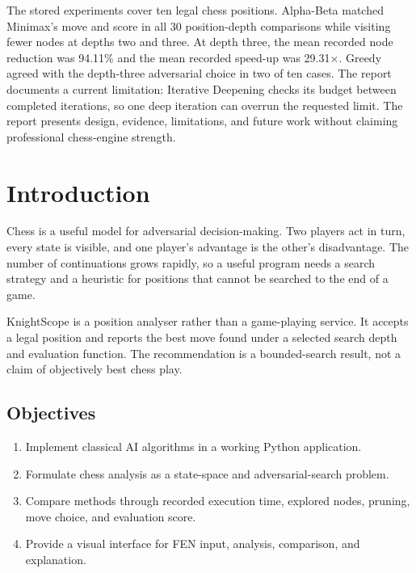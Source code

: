\documentclass[12pt,a4paper]{report}
\begin{document}
The stored experiments cover ten legal chess positions. Alpha-Beta matched Minimax's move and score in all 30 position-depth comparisons while visiting fewer nodes at depths two and three. At depth three, the mean recorded node reduction was 94.11\% and the mean recorded speed-up was 29.31$\times$. Greedy agreed with the depth-three adversarial choice in two of ten cases. The report documents a current limitation: Iterative Deepening checks its budget between completed iterations, so one deep iteration can overrun the requested limit. The report presents design, evidence, limitations, and future work without claiming professional chess-engine strength.

\tableofcontents\listoffigures\listoftables\clearpage{}
\chapter{Introduction}
Chess is a useful model for adversarial decision-making. Two players act in turn, every state is visible, and one player's advantage is the other's disadvantage. The number of continuations grows rapidly, so a useful program needs a search strategy and a heuristic for positions that cannot be searched to the end of a game.

KnightScope is a position analyser rather than a game-playing service. It accepts a legal position and reports the best move found under a selected search depth and evaluation function. The recommendation is a bounded-search result, not a claim of objectively best chess play.

\section{Objectives}
\begin{enumerate}[label=\arabic*.]
\item Implement classical AI algorithms in a working Python application.
\item Formulate chess analysis as a state-space and adversarial-search problem.
\item Compare methods through recorded execution time, explored nodes, pruning, move choice, and evaluation score.
\item Provide a visual interface for FEN input, analysis, comparison, and explanation.
\end{enumerate}
\end{document}
